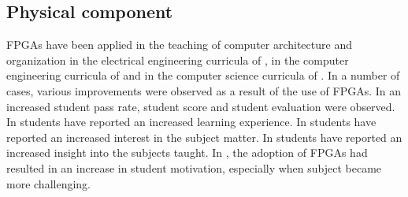 \documentclass[openright]{template/uva-bachelor-thesis}
\begin{document}
\subsection{Physical component}





FPGAs have been applied in the teaching of computer architecture and organization in the electrical engineering curricula of \cite{jansen2014every, oztekin2011bzk, el2011teaching, pereira2012basic}, in the computer engineering curricula of \cite{cifredo2015computer, kellett2012project, el2011teaching, pereira2012basic, lee2012pipelined, oztekin2011bzk} and in the computer science curricula of \cite{bulic2013fpga, el2011teaching, pereira2012basic, lee2012pipelined}. In a number of cases, various improvements were observed as a result of the use of FPGAs. In \cite{paharsingh2009novel} an increased student pass rate, student score and student evaluation were observed. In \cite{oztekin2011bzk} students have reported an increased learning experience. In \cite{cifredo2015computer} students have reported an increased interest in the subject matter. In \cite{bulic2013fpga, cifredo2015computer} students have reported an increased insight into the subjects taught. In \cite{bulic2013fpga}, the adoption of FPGAs had resulted in an increase in student motivation, especially when subject became more challenging.
\end{document}
